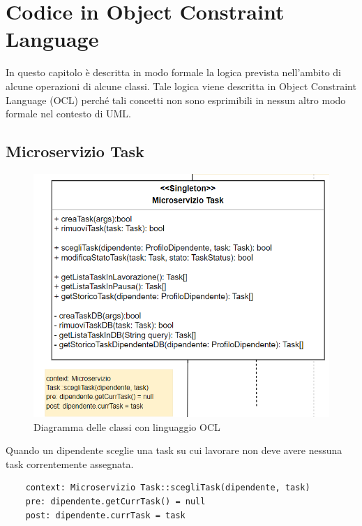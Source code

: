 \documentclass{report}
\begin{document}
\chapter{Codice in Object Constraint Language}	
In questo capitolo è descritta in modo formale la logica prevista nell’ambito di alcune operazioni di alcune classi.
Tale logica viene descritta in Object Constraint Language (OCL) perché tali concetti non sono esprimibili in nessun altro modo formale nel contesto di UML.	
\section{Microservizio Task}
\begin{figure}[H]
	\centering\includegraphics[width=1\textwidth]{images/OCL/OCL_task.png}
	Diagramma delle classi con linguaggio OCL 
\end{figure}
Quando un dipendente sceglie una task su cui lavorare non deve avere nessuna task correntemente assegnata.
\begin{verbatim}
	context: Microservizio Task::scegliTask(dipendente, task)
	pre: dipendente.getCurrTask() = null
	post: dipendente.currTask = task

\end{verbatim}
\end{document}
